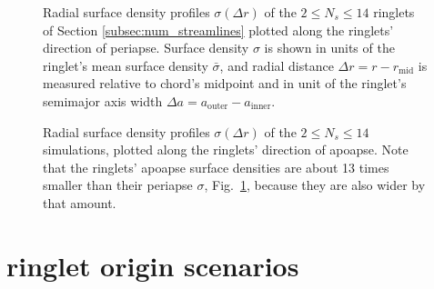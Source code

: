 \documentclass[preprint]{aastex62}
\begin{document}
\begin{figure}
    \caption{
        \label{fig:periapse_sigma_vs_r_streamlines.pdf}
        Radial surface density profiles $\sigma(\Delta r)$ 
        of the $2\le N_s\le14$ ringlets of Section \ref{subsec:num_streamlines}
        plotted along the ringlets' direction of periapse.
        Surface density $\sigma$ is shown in units of the ringlet's mean surface density $\bar{\sigma}$,
        and radial distance $\Delta r = r - r_{\text{mid}}$ is measured relative to chord's midpoint
        and in unit of the ringlet's semimajor axis width $\Delta a=a_{\text{outer}}-a_{\text{inner}}$. 
    }
\end{figure}
\begin{figure}
    \caption{
        \label{fig:apoapse_sigma_vs_r_streamlines.pdf}
        Radial surface density profiles $\sigma(\Delta r)$ 
        of the $2\le N_s\le14$ simulations, plotted along the ringlets' direction of apoapse.
        Note that the ringlets' apoapse surface densities are about 13 times smaller
        than their periapse $\sigma$, Fig.\ \ref{fig:periapse_sigma_vs_r_streamlines.pdf},
        because they are also wider by that amount.
    }
\end{figure}

\section{ringlet origin scenarios}
\label{sec:origin}
\end{document}
